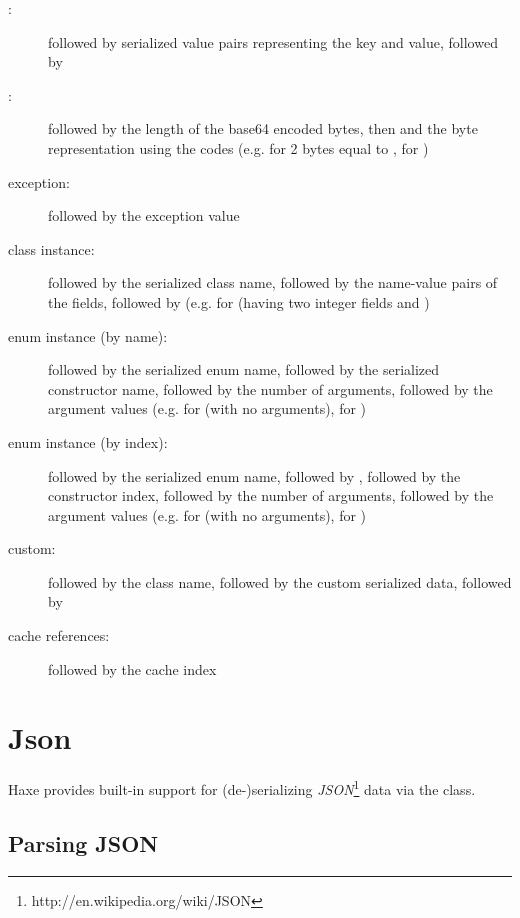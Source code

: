 \begin{description}
	\item[:]  followed by serialized value pairs representing the key and value, followed by 
	\item[:]  followed by the length of the base64 encoded bytes, then \expr{:} and the byte representation using the codes  (e.g.  for 2 bytes equal to ,  for )
	\item[exception:]  followed by the exception value
	\item[class instance:]  followed by the serialized class name, followed by the name-value pairs of the fields, followed by  (e.g.  for  (having two integer fields  and )
	\item[enum instance (by name):]  followed by the serialized enum name, followed by the serialized constructor name, followed by the number of arguments, followed by the argument values (e.g.  for  (with no arguments),  for )
	\item[enum instance (by index):]  followed by the serialized enum name, followed by \expr{:}, followed by the constructor index, followed by the number of arguments, followed by the argument values (e.g.  for  (with no arguments),  for )
	\item[custom:]  followed by the class name, followed by the custom serialized data, followed by 
	\item[cache references:]  followed by the cache index 
\end{description}


\section{Json}
\label{std-Json}

Haxe provides built-in support for (de-)serializing \emph{JSON}\footnote{http://en.wikipedia.org/wiki/JSON} data via the  class.

\subsection{Parsing JSON}
\label{std-Json-parsing}

